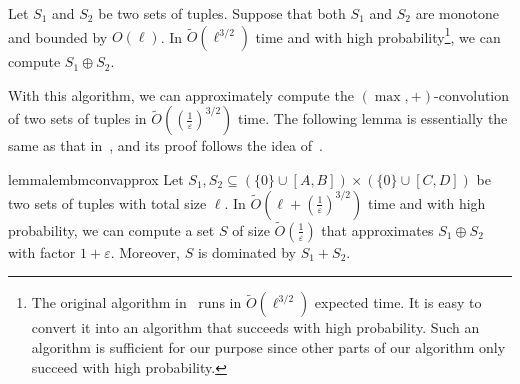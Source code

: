 \documentclass[a4paper,UKenglish,cleveref, autoref, thm-restate, pdfa]{lipics-v2021}
\newcommand{\eps}{\varepsilon}
\begin{document}
\begin{lemma}\label{lem:bm-conv-accurate}{\normalfont \cite{CDXZ22}}
    Let $S_1$ and $S_2$ be two sets of tuples. Suppose that both $S_1$ and $S_2$ are monotone and bounded by $O(\ell)$. In $\tilde{O}(\ell^{3/2})$ time and with high probability\footnote{The original algorithm in~\cite{CDXZ22} runs in $\tilde{O}(\ell^{3/2})$ expected time. It is easy to convert it into an algorithm that succeeds with high probability. Such an algorithm is sufficient for our purpose since other parts of our algorithm only succeed with high probability.}, we can compute $S_1 \oplus S_2$.
\end{lemma}

With this algorithm, we can approximately compute the $(\max,+)$-convolution of two sets of tuples in $\tilde{O}((\frac{1}{\eps})^{3/2})$ time. The following lemma is essentially the same as that in~\cite[Lemma 28 in the full version]{BC22}, and its proof follows the idea of~\cite[Lemma 1]{Chan18}.

\begin{restatable}{lemma}{lembmconvapprox}
\label{lem:bm-conv-approx}
    Let $S_1, S_2 \subseteq (\{0\} \cup [A, B]) \times (\{0\} \cup [C, D])$ be two sets of tuples with total size $\ell$. In $\tilde{O}(\ell + (\frac{1}{\eps})^{3/2})$ time and with high probability, we can compute a set $S$ of size $\tilde{O}(\frac{1}{\eps})$ that approximates $S_1 \oplus S_2$ with factor $1 + \eps$.  Moreover, $S$ is dominated by $S_1 + S_2$.
\end{restatable}
    
\end{document}
